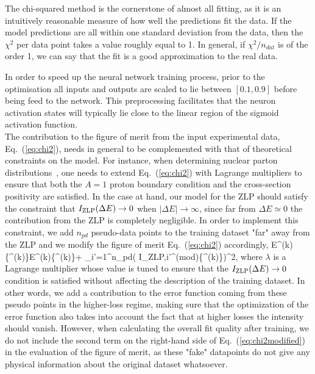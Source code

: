 The chi-squared method is the cornerstone of almost all fitting, 
as it is an intuitively reasonable measure of how well the predictions fit the data. 
%
If the model predictions are all within one standard deviation from the data, 
then the $\chi^2$ per data point takes a value roughly equal to 1. 
%
In general, if $\chi^2/n_{dat}$ is of the order 1, we can say that the 
fit is a good approximation to the real data. 

In order to speed up the neural network training process, prior to the optimisation
all inputs and outputs are scaled to lie between $[0.1, 0.9]$ before
being feed to the network.
%
This preprocessing facilitates that
the neuron activation states will typically
lie close to the linear region of the sigmoid activation function.\\

The contribution to the figure of merit from the input experimental data, Eq.~(\ref{eq:chi2}),
needs in general to be complemented with that of theoretical constraints on the model.
%
For instance, when determining nuclear parton distributions~\cite{AbdulKhalek:2020yuc}, one needs to
extend Eq.~(\ref{eq:chi2}) with Lagrange multipliers to ensure that both the $A=1$ proton boundary
condition and the cross-section positivity are satisfied.
%
In the case at hand, our model for the ZLP should satisfy the constraint that $I_{\rm ZLP}(\Delta E)\to 0$
when $|\Delta E| \to \infty$, since far from $\Delta E\simeq 0$ the contribution from the ZLP
is completely negligible.
%
In order to implement this constraint, we add $n_{pd}$ pseudo-data points to the training dataset 
"far" away from the ZLP and we modify
the figure of merit Eq.~(\ref{eq:chi2}) accordingly,
\be
\label{eq:chi2modified}
E^{(k)}\lp \{\theta^{(k)}\}\rp \to E^{(k)}\lp \{\theta^{(k)}\}\rp +
\lambda \sum_{i'=1}^{n_{pd}}\left(
  I_{{\rm ZLP},i'}^{{\rm (mod)}}\lp \{\theta^{(k)}\}\rp \right)^2, 
  \ee
  where $\lambda$ is a Lagrange multiplier whose value is tuned to ensure that the $I_{\rm ZLP}(\Delta E)\to 0$
  condition
  is satisfied without affecting the description of the training dataset.
  In other words, we add a contribution to the error function coming from these pseudo points in the
  higher-loss regime, making sure that the optimization of the error function also takes into account
  the fact that at higher losses the intensity should vanish.
  However, when calculating the overall fit quality after training, we do not include the second term
  on the right-hand side of Eq.~(\ref{eq:chi2modified}) in the evaluation of the figure of merit, 
  as these "fake" datapoints do not give any physical
  information about the original dataset whatsoever.

